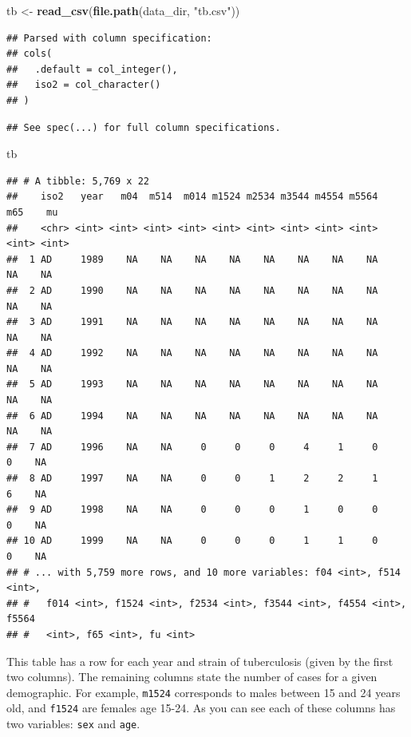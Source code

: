 \documentclass[12pt,]{book}
\newenvironment{Shaded}{\begin{snugshade}}{\end{snugshade}}
\newcommand{\KeywordTok}[1]{\textcolor[rgb]{0.13,0.29,0.53}{\textbf{#1}}}
\newcommand{\StringTok}[1]{\textcolor[rgb]{0.31,0.60,0.02}{#1}}
\newcommand{\NormalTok}[1]{#1}
\theoremstyle{definition}
\theoremstyle{definition}
\theoremstyle{definition}
\theoremstyle{remark}
\begin{document}
\begin{Shaded}
\begin{Highlighting}[]
\NormalTok{tb <-}\StringTok{ }\KeywordTok{read_csv}\NormalTok{(}\KeywordTok{file.path}\NormalTok{(data_dir, }\StringTok{"tb.csv"}\NormalTok{))}
\end{Highlighting}
\end{Shaded}

\begin{verbatim}
## Parsed with column specification:
## cols(
##   .default = col_integer(),
##   iso2 = col_character()
## )
\end{verbatim}

\begin{verbatim}
## See spec(...) for full column specifications.
\end{verbatim}

\begin{Shaded}
\begin{Highlighting}[]
\NormalTok{tb}
\end{Highlighting}
\end{Shaded}

\begin{verbatim}
## # A tibble: 5,769 x 22
##    iso2   year   m04  m514  m014 m1524 m2534 m3544 m4554 m5564   m65    mu
##    <chr> <int> <int> <int> <int> <int> <int> <int> <int> <int> <int> <int>
##  1 AD     1989    NA    NA    NA    NA    NA    NA    NA    NA    NA    NA
##  2 AD     1990    NA    NA    NA    NA    NA    NA    NA    NA    NA    NA
##  3 AD     1991    NA    NA    NA    NA    NA    NA    NA    NA    NA    NA
##  4 AD     1992    NA    NA    NA    NA    NA    NA    NA    NA    NA    NA
##  5 AD     1993    NA    NA    NA    NA    NA    NA    NA    NA    NA    NA
##  6 AD     1994    NA    NA    NA    NA    NA    NA    NA    NA    NA    NA
##  7 AD     1996    NA    NA     0     0     0     4     1     0     0    NA
##  8 AD     1997    NA    NA     0     0     1     2     2     1     6    NA
##  9 AD     1998    NA    NA     0     0     0     1     0     0     0    NA
## 10 AD     1999    NA    NA     0     0     0     1     1     0     0    NA
## # ... with 5,759 more rows, and 10 more variables: f04 <int>, f514 <int>,
## #   f014 <int>, f1524 <int>, f2534 <int>, f3544 <int>, f4554 <int>, f5564
## #   <int>, f65 <int>, fu <int>
\end{verbatim}

This table has a row for each year and strain of tuberculosis (given by
the first two columns). The remaining columns state the number of cases
for a given demographic. For example, \texttt{m1524} corresponds to
males between 15 and 24 years old, and \texttt{f1524} are females age
15-24. As you can see each of these columns has two variables:
\texttt{sex} and \texttt{age}.
\end{document}
